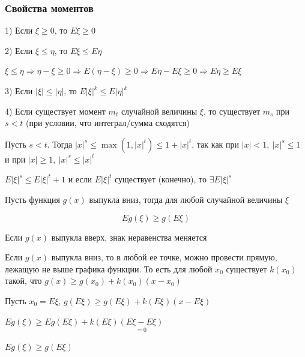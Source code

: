 \documentclass[12pt]{article}
\begin{document}
    \hypertarget{momentsproperties}{}

    \subsubsection{Свойства моментов}

    1) Если $\xi \geq 0$, то $E\xi \geq 0$

    2) Если $\xi \leq \eta$, то $E\xi \leq E\eta$

    \begin{MyProof}
        $\xi \leq \eta \Longrightarrow \eta - \xi \geq 0 \Longrightarrow E(\eta - \xi) \geq 0 \Longrightarrow E\eta - E\xi \geq 0 \Longrightarrow E\eta \geq E\xi$
    \end{MyProof}

    3) Если $|\xi| \leq |\eta|$, то $E|\xi|^k \leq E|\eta|^k$

    4) Если существует момент $m_t$ случайной величины $\xi$, то существует $m_s$ при $s < t$ (при условии, что интеграл/сумма сходятся)

    \begin{MyProof}
        Пусть $s < t$. Тогда $|x|^s \leq \max(1, |x|^t) \leq 1 + |x|^t$, так как при $|x| < 1, \ |x|^s \leq 1$ и при $|x| \geq 1, \ |x|^s \leq |x|^t$
    
        $E|\xi|^s \leq E|\xi|^t + 1$ и если $E|\xi|^t$ существует (конечно), то $\exists E|\xi|^s$
    
    \end{MyProof}

    \hypertarget{jensensinequality}{}

    \begin{MyTheorem}
         Пусть функция $g(x)$ выпукла вниз, тогда для любой случайной величины $\xi$

        \[Eg(\xi) \geq g(E\xi)\]
    \end{MyTheorem}

    \Nota Если $g(x)$ выпукла вверх, знак неравенства меняется
    
    \begin{MyProof}
        Если $g(x)$ выпукла вниз, то в любой ее точке, можно провести прямую, лежащую не выше графика функции. То есть для 
        любой $x_0$ существует $k(x_0)$ такой, что $g(x) \geq g(x_0) + k(x_0) (x - x_0)$

        Пусть $x_0 = E\xi$, $g(E\xi) \geq g(E\xi) + k(E\xi) (x - E\xi)$

        $Eg(\xi) \geq Eg(E\xi) + k(E\xi) \underset{= 0}{(E\xi - E\xi)}$

        $Eg(\xi) \geq g(E\xi)$
    \end{MyProof}
\end{document}
